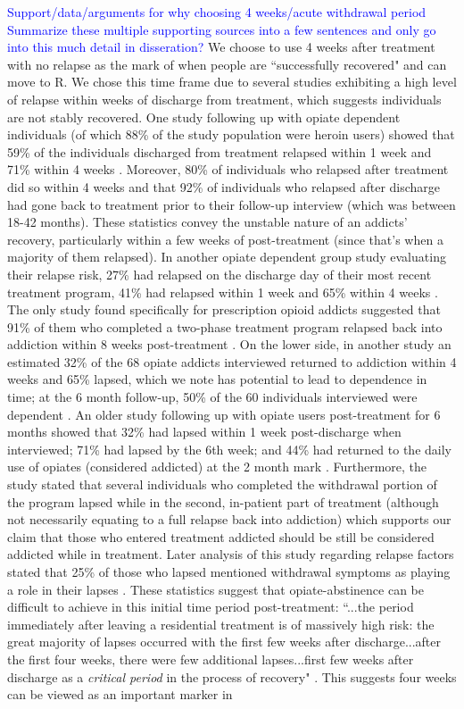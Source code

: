 \documentclass[12pt]{article}
\begin{document}
\textcolor{blue}{Support/data/arguments for why choosing 4 weeks/acute withdrawal period} \\
\textcolor{blue}{Summarize these multiple supporting sources into a few sentences and only go into this much detail in disseration?}
We choose to use 4 weeks after treatment with no relapse as the mark of when people are ``successfully recovered" and can move to R. We chose this time frame due to several studies exhibiting a high level of relapse within weeks of discharge from treatment, which suggests individuals are not stably recovered. One study following up with opiate dependent individuals (of which 88\% of the study population were heroin users) showed that 59\% of the individuals discharged from treatment relapsed within 1 week and 71\% within 4 weeks \cite{Smyth}. Moreover, 80\% of individuals who relapsed after treatment did so within 4 weeks and that 92\% of individuals who relapsed after discharge had gone back to treatment prior to their follow-up interview (which was between 18-42 months). These statistics convey the unstable nature of an addicts' recovery, particularly within a few weeks of post-treatment (since that's when a majority of them relapsed). In another opiate dependent group study evaluating their relapse risk, 27\% had relapsed on the discharge day of their most recent treatment program, 41\% had relapsed within 1 week and 65\% within 4 weeks \cite{Bailey}. The only study found specifically for prescription opioid addicts suggested that 91\% of them who completed a two-phase treatment program relapsed back into addiction within 8 weeks post-treatment \cite{Weiss}. On the lower side, in another study an estimated 32\% of the 68 opiate addicts interviewed returned to addiction within 4 weeks and 65\% lapsed, which we note has potential to lead to dependence in time; at the 6 month follow-up, 50\% of the 60 individuals interviewed were dependent \cite{Broers}. An older study following up with opiate users post-treatment for 6 months showed that 32\% had lapsed within 1 week post-discharge when interviewed; 71\% had lapsed by the 6th week; and 44\% had returned to the daily use of opiates (considered addicted) at the 2 month mark \cite{Gossop1}. Furthermore, the study stated that several individuals who completed the withdrawal portion of the program lapsed while in the second, in-patient part of treatment (although not necessarily equating to a full relapse back into addiction) which supports our claim that those who entered treatment addicted should be still be considered addicted while in treatment. Later analysis of this study regarding relapse factors stated that 25\% of those who lapsed mentioned withdrawal symptoms as playing a role in their lapses \cite{Gossop2}. These statistics suggest that opiate-abstinence can be difficult to achieve in this initial time period post-treatment: ``...the period immediately after leaving a residential treatment is of massively high risk: the great majority of lapses occurred with the first few weeks after discharge...after the first four weeks, there were few additional lapses...first few weeks after discharge as a \textit{critical period} in the process of recovery" \cite{Gossop1}. This suggests four weeks can be viewed as an important marker in 
\end{document}
